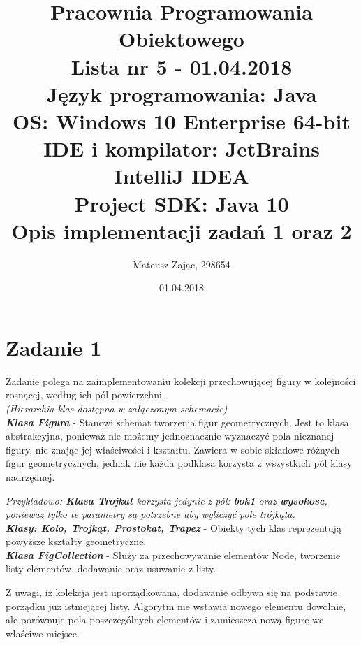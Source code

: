 \documentclass[12pt]{article}
\begin{document}
\title{
\textbf{Pracownia Programowania Obiektowego\\}
\textbf{Lista nr 5 - 01.04.2018\\}
\textbf{Język programowania:} Java\\
\textbf{OS:} Windows 10 Enterprise 64-bit\\
\textbf{IDE i kompilator:} JetBrains IntelliJ IDEA\\
\textbf{Project SDK:} Java 10\\
Opis implementacji zadań 1 oraz 2
}

\author {Mateusz Zając, 298654}

\date {01.04.2018} 

\maketitle

\newpage

\section{Zadanie 1}

Zadanie polega na zaimplementowaniu kolekcji przechowującej figury w kolejności rosnącej, według ich pól powierzchni. \\
\textit{(Hierarchia klas dostępna w załączonym schemacie)} \\

\textbf{\textit{Klasa Figura}} - Stanowi schemat tworzenia figur geometrycznych. Jest to klasa abstrakcyjna, ponieważ nie możemy jednoznacznie wyznaczyć pola nieznanej figury, nie znając jej właściwości i kształtu. Zawiera w sobie składowe różnych figur geometrycznych, jednak nie każda podklasa korzysta z wszystkich pól klasy nadrzędnej. 

\textit{Przykładowo: \textbf{\textit{Klasa Trojkat}} korzysta jedynie z pól: \textbf{\textunderscore bok1} oraz \textbf{\textunderscore wysokosc}, ponieważ tylko te parametry są potrzebne aby wyliczyć pole trójkąta.}\\

\textbf{\textit{Klasy: Kolo, Trojkąt, Prostokat, Trapez}} - Obiekty tych klas reprezentują powyższe kształty geometryczne. \\

\textbf{\textit{Klasa FigCollection}} - Służy za przechowywanie elementów Node, tworzenie listy elementów, dodawanie oraz usuwanie z listy. 

Z uwagi, iż kolekcja jest uporządkowana, dodawanie odbywa się na podstawie porządku już istniejącej listy. Algorytm nie wstawia nowego elementu dowolnie, ale porównuje pola poszczególnych elementów i zamieszcza nową figurę we właściwe miejsce.\\ 
\end{document}
